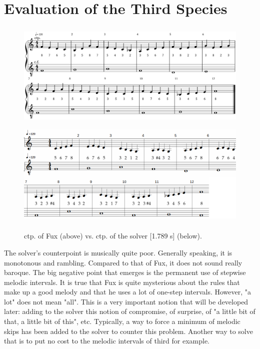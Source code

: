 \section{Evaluation of the Third Species}
\begin{minipage}{0.60\textwidth}
    \begin{figure}[H]
        \includegraphics[width=1\textwidth, height=2.0in]{Images/complete_third_species_f.png}
        \includegraphics[width=1\textwidth, height=2.0in]{Images/solver_3sp.png}
        \caption{ ctp. of Fux (above) vs. ctp. of the solver [1.789 s] (below).}
        \label{fig:eval_3sp}
    \end{figure}
\end{minipage} \hfill
\begin{minipage}{0.38\textwidth}
    The solver's counterpoint is musically quite poor. Generally speaking, it is monotonous and rambling. Compared to that of Fux, it does not sound really baroque. The big negative point that emerges is the permanent use of stepwise melodic intervals. It is true that Fux is quite mysterious about the rules that make up a good melody and that he uses a lot of one-step intervals. However, "a lot" does not mean "all". This is a very important notion that will be developed later: adding to the solver this notion of compromise, of surprise, of "a little bit of that, a little bit of this", etc. Typically, a way to force a minimum of melodic skips has been added to the solver to counter this problem.
    Another way to solve that is to put no cost to the melodic intervals of third for example.\\
\end{minipage}

